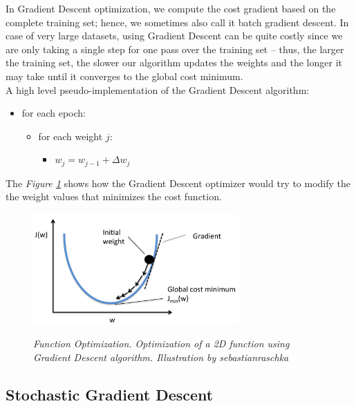 In Gradient Descent optimization, we compute the cost gradient based on the complete training set; hence, we sometimes also call it batch gradient descent. In case of very large datasets, using Gradient Descent can be quite costly since we are only taking a single step for one pass over the training set – thus, the larger the training set, the slower our algorithm updates the weights and the longer it may take until it converges to the global cost minimum. \\

A high level pseudo-implementation of the Gradient Descent algorithm:

\begin{itemize}[label=\(\circ\)]
  \item for each epoch:
  \begin{itemize}[label=\(\circ\), topsep=0pt]
    \item for each weight \(j\):
    \begin{itemize}[label=\(\circ\), topsep=5pt]
      \item \(w_j = w_{j-1} + \Delta w_j\)
    \end{itemize}
  \end{itemize}
\end{itemize}

The \textit{Figure \ref{fig:optimization}} shows how the Gradient Descent optimizer would try to modify the  the weight values that minimizes the cost function.

\begin{figure}[H]
\centering
\includegraphics[width=0.7\textwidth]{imatges/preliminaries/optimization.png}
    \caption[Function Optimization]{\textit{Function Optimization. Optimization of a 2D function using Gradient Descent algorithm. Illustration by sebastianraschka}}
{\label{fig:optimization}}
\end{figure}

\newpage

\subsection{Stochastic Gradient Descent}

